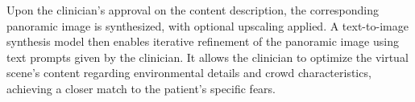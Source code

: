 \documentclass[]{interact}
\begin{document}

Upon the clinician's approval on the content description, the corresponding panoramic image is synthesized, with optional upscaling applied. A text-to-image synthesis model then enables iterative refinement of the panoramic image using text prompts given by the clinician. It allows the clinician to optimize the virtual scene's content regarding environmental details and crowd characteristics, achieving a closer match to the patient's specific fears.


\end{document}
